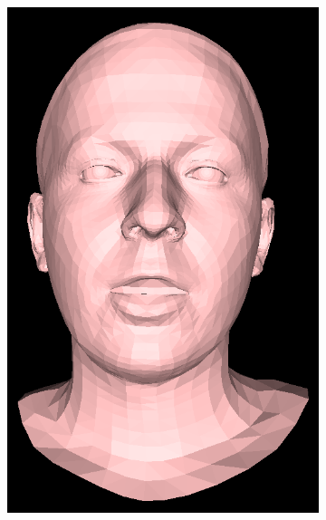 \begin{figure}[h]
\begin{subfigure}[b]{0.19\textwidth}
        \includegraphics[width=\textwidth]{figures/voca_exp/vocaset_exp2.png}
    \end{subfigure}
    \begin{subfigure}[b]{0.19\textwidth}

\end{subfigure}
\end{figure}
